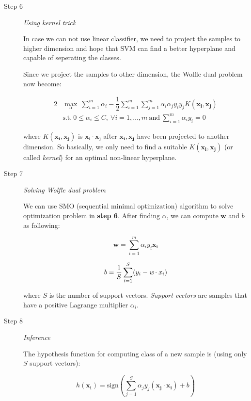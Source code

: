 \begin{description}
	\item[Step 6] \emph{Using kernel trick}
	
	In case we can not use linear classifier, we need to project the samples to higher dimension and hope that SVM can find a better hyperplane and capable of seperating the classes. 
	
	Since we project the samples to other dimension, the Wolfle dual problem now become:
	
	\begin{alignat*}{2}
		&\max_{\alpha} \ \sum_{i=1}^m \alpha_i - \dfrac{1}{2} \sum_{i=1}^m \sum_{j=1}^m \alpha_i\alpha_j y_iy_j \boxed{ K( \bm{x_i}, \bm{x_j} ) } \\
		&\text{s.t.} \ 0 \leq \alpha_i \leq C, \ \forall i = 1, \ldots, m \ \text{and} \ \sum_{i=1}^m \alpha_iy_i = 0
	\end{alignat*}
	
	where $K( \bm{x_i}, \bm{x_j} )$ is $\bm{x_i} \cdot \bm{x_j}$ after $\bm{x_i}, \bm{x_j}$ have been projected to another dimension. So basically, we only need to find a suitable $K( \bm{x_i}, \bm{x_j} )$ (or called \emph{kernel}) for an optimal non-linear hyperplane.
	
	\item[Step 7] \emph{Solving Wolfle dual problem}
	
	We can use SMO (sequential minimal optimization) algorithm to solve optimization problem in \textbf{step 6}. After finding $\alpha$, we can compute $\bm{w}$ and $b$ as following:
	
	\begin{equation*}
		\bm{w} = \sum_{i = 1}^m \alpha_iy_i\bm{x_i}
	\end{equation*}
	
	\begin{equation*}
		b = \dfrac{1}{S}\sum_{i = 1}^S (y_i - \emph{w} \cdot x_i)
	\end{equation*}
	
	where $S$ is the number of support vectors. \emph{Support vectors} are samples that have a positive Lagrange multiplier $\alpha_i$.
	
	\item[Step 8] \emph{Inference}
	
	The hypothesis function for computing class of a new sample is (using only $S$ support vectors):
	
	\begin{equation*}
		h(\bm{x_i}) = \text{sign} \left( \sum_{j = 1}^S \alpha_jy_j( \bm{x_j} \cdot \bm{x_i}) + b \right)
	\end{equation*}

\end{description}

